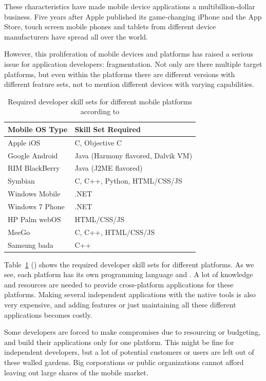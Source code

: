These characteristics have made mobile device applications a
multibillion-dollar business. Five years after Apple published its
game-changing iPhone and the App Store, touch screen mobile phones and
tablets from different device manufacturers have spread all over the
world. \cite{cortimiglia2011mobile, charland2011mobile,
  fling2009mobile}

However, this proliferation of mobile devices and platforms has raised
a serious issue for application developers: fragmentation. Not only
are there multiple target platforms, but even within the platforms
there are different versions with different feature sets, not to
mention different devices with varying
capabilities. \cite{charland2011mobile}

\begin{table}
  \begin{tabular}{ l | l }
    \textbf{Mobile OS Type} & \textbf{Skill Set Required} \\
    \hline
    Apple iOS & C, Objective C \\
    Google Android & Java (Harmony flavored, Dalvik VM) \\
    RIM BlackBerry & Java (J2ME flavored) \\
    Symbian & C, C++, Python, HTML/CSS/JS \\
    Windows Mobile & .NET \\
    Windows 7 Phone & .NET \\
    HP Palm webOS & HTML/CSS/JS \\
    MeeGo & C, C++, HTML/CSS/JS \\
    Samsung bada & C++
  \end{tabular}
  \label{table:native-skills}
  \caption{Required developer skill sets for different mobile
    platforms according to \cite{charland2011mobile}}
\end{table}

Table~\ref{table:native-skills} () shows
the required developer skill sets for different platforms. As we see,
each platform has its own programming language and . A lot
of knowledge and resources are needed to provide cross-platform
applications for these platforms. Making several independent
applications with the native tools is also very expensive, and adding
features or just maintaining all these different applications becomes
costly. \cite{charland2011mobile}

Some developers are forced to make compromises due to resourcing or
budgeting, and build their applications only for one platform. This
might be fine for independent developers, but a lot of potential
customers or users are left out of these walled gardens. Big
corporations or public organizations cannot afford leaving out large
shares of the mobile market. \cite{berners2010long}

